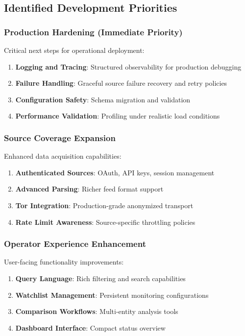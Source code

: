\documentclass[12pt,a4paper]{article}
\begin{document}
\subsection{Identified Development Priorities}

\subsubsection{Production Hardening (Immediate Priority)}
Critical next steps for operational deployment:

\begin{enumerate}
\item \textbf{Logging and Tracing}: Structured observability for production debugging
\item \textbf{Failure Handling}: Graceful source failure recovery and retry policies
\item \textbf{Configuration Safety}: Schema migration and validation
\item \textbf{Performance Validation}: Profiling under realistic load conditions
\end{enumerate}

\subsubsection{Source Coverage Expansion}
Enhanced data acquisition capabilities:

\begin{enumerate}
\item \textbf{Authenticated Sources}: OAuth, API keys, session management
\item \textbf{Advanced Parsing}: Richer feed format support
\item \textbf{Tor Integration}: Production-grade anonymized transport
\item \textbf{Rate Limit Awareness}: Source-specific throttling policies
\end{enumerate}

\subsubsection{Operator Experience Enhancement}
User-facing functionality improvements:

\begin{enumerate}
\item \textbf{Query Language}: Rich filtering and search capabilities
\item \textbf{Watchlist Management}: Persistent monitoring configurations
\item \textbf{Comparison Workflows}: Multi-entity analysis tools
\item \textbf{Dashboard Interface}: Compact status overview
\end{enumerate}
\end{document}
